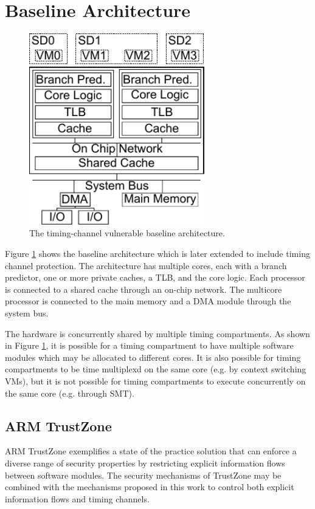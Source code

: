 \section{Baseline Architecture}

    \begin{figure}
        \begin{center}
            \includegraphics[width=3in]{figs/baseline.pdf}
            \caption{The timing-channel vulnerable baseline architecture.}
            \label{fig:baseline}
        \end{center}
    \end{figure}

    Figure \ref{fig:baseline} shows the baseline architecture which is later 
    extended to include timing channel protection. The architecture has 
    multiple cores, each with a branch predictor, one or more private caches, a 
    TLB, and the core logic. Each processor is connected to a shared cache 
    through an on-chip network. The multicore processor is connected to the 
    main memory and a DMA module through the system bus. 

    The hardware is concurrently shared by multiple timing compartments. As 
    shown in Figure \ref{fig:baseline}, it is possible for a timing compartment 
    to have multiple software modules which may be allocated to different 
    cores. It is also possible for timing compartments to be time multiplexd on 
    the same core (e.g.  by context switching VMs), but it is not possible for 
    timing compartments to execute concurrently on the same core (e.g. through 
    SMT).

    \subsection{ARM TrustZone}
    ARM TrustZone exemplifies a state of the practice solution that can enforce 
    a diverse range of security properties by restricting explicit information 
    flows between software modules. The security mechanisms of TrustZone may be 
    combined with the mechanisms proposed in this work to control both explicit 
    information flows and timing channels.

